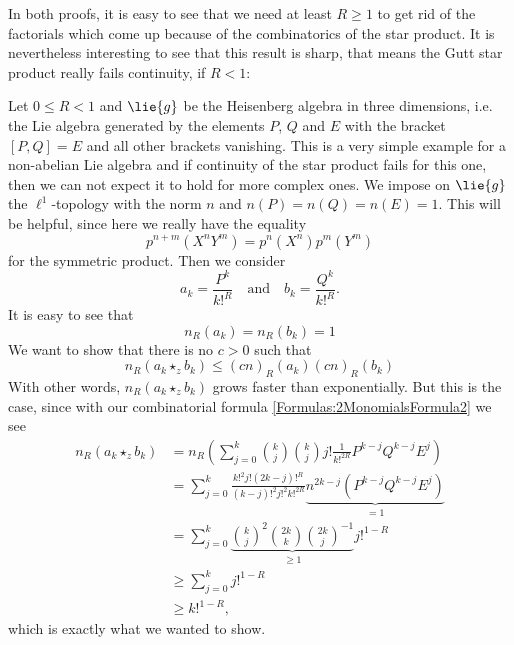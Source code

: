 In both proofs, it is easy to see that we need at least $R \geq 1$ to
get rid of the factorials which come up because of the combinatorics
of the star product. It is nevertheless interesting to see that this
result is sharp, that means the Gutt star product really fails
continuity, if $R < 1$:
\begin{example}
    \label{LCAna:Ex:HeisenbergAlgebra}%
    Let $0 \leq R < 1$ and $\lie{g}$ be the Heisenberg algebra in three 
    dimensions, i.e. the Lie algebra generated by the elements 
    $P$, $Q$ and $E$ with the bracket $[P,Q] = E$ and all other brackets
    vanishing. This is a very simple example for a non-abelian Lie algebra
    and if continuity of the star product fails for this one, then we
    can not expect it to hold for more complex ones. We impose on
    $\lie{g}$ the $\ell^1$-topology with the norm $n$ and $n(P) = n(Q)
    = n(E) = 1$. This will be helpful, since here we really have the equality
    \begin{equation*}
    		p^{n+m} \left( X^n Y^m \right)
    		=
    		p^n \left( X^n \right)
    		p^m \left( Y^m \right)
    \end{equation*}
    for the symmetric product. Then we consider
    \begin{equation*}
        a_k
        =
        \frac{P^k}{k!^R}
        \quad
        \textrm{and}
        \quad
        b_k
        =
        \frac{Q^k}{k!^R}.
    \end{equation*}
    It is easy to see that
    \begin{equation*}
        n_R(a_k)
        =
        n_R(b_k)
        =
        1
    \end{equation*}
    We want to show that there is no $c > 0$ such that
    \begin{equation*}
        n_R(a_k \star_z b_k)
        \leq
        (c n)_R(a_k) (c n)_R(b_k)
    \end{equation*}
    With other words, $n_R(a_k \star_z b_k)$ grows faster than
    exponentially. But this is the case, since with our combinatorial
    formula \eqref{Formulas:2MonomialsFormula2} we see
    \begin{align*}
        n_R(a_k \star_z b_k)
        & =
        n_R \left(
        \sum\limits_{j=0}^k
        \binom{k}{j}
        \binom{k}{j}
        j! \frac{1}{k!^{2R}}
        P^{k-j} Q^{k-j} E^j
        \right)
        \\
        & =
        \sum\limits_{j=0}^k
        \frac{k!^2 j! (2k - j)!^R}{(k-j)!^2 j!^2 k!^{2R}}
        \underbrace{
        n^{2k-j}
        ( P^{k-j} Q^{k-j} E^j )
        }_{= 1}
        \\
        & =
        \sum\limits_{j=0}^k
        \underbrace{
        \binom{k}{j}^2 \binom{2k}{k} \binom{2k}{j}^{-1}
        }_{\geq 1}
        j!^{1-R}
        \\
        & \geq
        \sum\limits_{j=0}^k
        j!^{1-R}
        \\
        & \geq
        k!^{1-R},
    \end{align*}
    which is exactly what we wanted to show.
\end{example}



